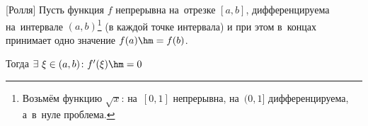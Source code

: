 [Ролля]\label{Roll}
Пусть функция $f$ непрерывна на~отрезке $[a,b]$, дифференцируема на~интервале
$(a,b)$\footnote{Возьмём функцию $\sqrt x$: на~$[0,1]$ непрерывна, на~$(0,1]$ дифференцируема, а~в~нуле проблема.}
(в каждой точке интервала) и при этом в~концах принимает одно значение $f(a)\hm=f(b)$.

Тогда $\exists\ \xi\in(a,b)\colon f'(\xi)\hm=0$
